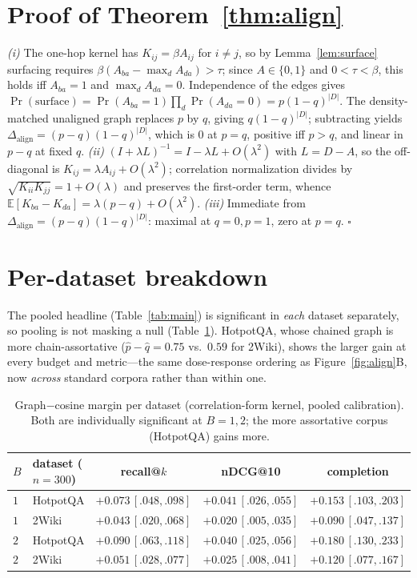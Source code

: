 \documentclass[11pt]{article}
\theoremstyle{plain}\newtheorem{theorem}{Theorem}\newtheorem{lemma}{Lemma}\newtheorem{proposition}{Proposition}
\theoremstyle{definition}\newtheorem{assumption}{Assumption}\newtheorem{remark}{Remark}
\newcommand{\E}{\mathbb{E}}\newcommand{\R}{\mathbb{R}}\newcommand{\N}{\mathcal{N}}\newcommand{\corr}{\mathrm{corr}}
\begin{document}
\appendix
\section{Proof of Theorem~\ref{thm:align}}\label{app:proof}
\emph{(i)} The one-hop kernel has $K_{ij}=\beta A_{ij}$ for $i\neq j$, so by Lemma~\ref{lem:surface} surfacing
requires $\beta(A_{ba}-\max_d A_{da})>\tau$; since $A\in\{0,1\}$ and $0<\tau<\beta$, this holds iff $A_{ba}=1$ and
$\max_d A_{da}=0$. Independence of the edges gives $\Pr(\text{surface})=\Pr(A_{ba}=1)\prod_d\Pr(A_{da}=0)=
p(1-q)^{|D|}$. The density-matched unaligned graph replaces $p$ by $q$, giving $q(1-q)^{|D|}$; subtracting yields
$\Delta_{\mathrm{align}}=(p-q)(1-q)^{|D|}$, which is $0$ at $p=q$, positive iff $p>q$, and linear in $p-q$ at fixed
$q$. \emph{(ii)} $(I+\lambda L)^{-1}=I-\lambda L+O(\lambda^2)$ with $L=D-A$, so the off-diagonal is
$K_{ij}=\lambda A_{ij}+O(\lambda^2)$; correlation normalization divides by $\sqrt{K_{ii}K_{jj}}=1+O(\lambda)$ and
preserves the first-order term, whence $\E[K_{ba}-K_{da}]=\lambda(p-q)+O(\lambda^2)$. \emph{(iii)} Immediate from
$\Delta_{\mathrm{align}}=(p-q)(1-q)^{|D|}$: maximal at $q{=}0,p{=}1$, zero at $p=q$. \hfill$\square$

\section{Per-dataset breakdown}\label{app:perds}
The pooled headline (Table~\ref{tab:main}) is significant in \emph{each} dataset separately, so pooling is not
masking a null (Table~\ref{tab:perds}). HotpotQA, whose chained graph is more chain-assortative
($\hat p-\hat q=0.75$ vs.\ $0.59$ for 2Wiki), shows the larger gain at every budget and metric---the same
dose-response ordering as Figure~\ref{fig:align}B, now \emph{across} standard corpora rather than within one.
\begin{table}[h]\centering\small
\begin{tabular}{llccc}
\toprule
$B$ & dataset ($n{=}300$) & recall@$k$ & nDCG@10 & completion \\ \midrule
$1$ & HotpotQA & $+0.073\,[.048,.098]$ & $+0.041\,[.026,.055]$ & $+0.153\,[.103,.203]$ \\
$1$ & 2Wiki    & $+0.043\,[.020,.068]$ & $+0.020\,[.005,.035]$ & $+0.090\,[.047,.137]$ \\
$2$ & HotpotQA & $+0.090\,[.063,.118]$ & $+0.040\,[.025,.056]$ & $+0.180\,[.130,.233]$ \\
$2$ & 2Wiki    & $+0.051\,[.028,.077]$ & $+0.025\,[.008,.041]$ & $+0.120\,[.077,.167]$ \\
\bottomrule
\end{tabular}
\caption{Graph$-$cosine margin per dataset (correlation-form kernel, pooled calibration). Both are individually
significant at $B{=}1,2$; the more assortative corpus (HotpotQA) gains more.}\label{tab:perds}
\end{table}
\end{document}
